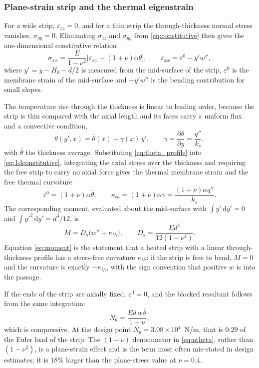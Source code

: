 \documentclass[11pt,a4paper]{article}
\newcommand{\eps}{\varepsilon}
\newcommand{\dd}{\mathrm{d}}
\begin{document}
\subsubsection{Plane-strain strip and the thermal eigenstrain}
\label{sec:eigenstrain}

For a wide strip, $\eps_{zz}=0$, and for a thin strip the through-thickness
normal stress vanishes, $\sigma_{yy}=0$. Eliminating $\sigma_{zz}$ and
$\sigma_{yy}$ from \eqref{eq:constitutive} then gives the one-dimensional
constitutive relation
\begin{equation}
\sigma_{xx}=\frac{E}{1-\nu^2}\bigl[\eps_{xx}-(1+\nu)\alpha\theta\bigr],
\qquad
\eps_{xx}=\eps^{0}-y'w'',
\label{eq:1dconstitutive}
\end{equation}
where $y'=y-H_0-d/2$ is measured from the mid-surface of the strip,
$\eps^{0}$ is the membrane strain of the mid-surface and $-y'w''$ is the
bending contribution for small slopes.

The temperature rise through the thickness is linear to leading order,
because the strip is thin compared with the axial length and its faces carry a
uniform flux and a convective condition,
\begin{equation}
\theta(y',x)=\bar\theta(x)+\gamma(x)\,y',
\qquad \gamma=\frac{\partial\theta}{\partial y}=\frac{q''}{k_s},
\label{eq:theta_profile}
\end{equation}
with $\bar\theta$ the thickness average. Substituting
\eqref{eq:theta_profile} into \eqref{eq:1dconstitutive}, integrating the axial
stress over the thickness and requiring the free strip to carry no axial force
gives the thermal membrane strain and the free thermal curvature
\begin{equation}
\eps^{0}=(1+\nu)\alpha\bar\theta,
\qquad
\kappa_{th}=(1+\nu)\alpha\gamma=\frac{(1+\nu)\alpha q''}{k_s}.
\label{eq:kappa}
\end{equation}
The corresponding moment, evaluated about the mid-surface with
$\int y'\,\dd y'=0$ and $\int y'^2\,\dd y'=d^3/12$, is
\begin{equation}
M=D_s\bigl(w''+\kappa_{th}\bigr),
\qquad
D_s=\frac{E d^3}{12(1-\nu^2)}.
\label{eq:moment}
\end{equation}
Equation \eqref{eq:moment} is the statement that a heated strip with a linear
through-thickness profile has a stress-free curvature $\kappa_{th}$: if the
strip is free to bend, $M=0$ and the curvature is exactly $-\kappa_{th}$, with
the sign convention that positive $w$ is into the passage.

If the ends of the strip are axially fixed, $\eps^{0}=0$, and the blocked
resultant follows from the same integration:
\begin{equation}
N_\theta=\frac{E d\,\alpha\,\bar\theta}{1-\nu},
\label{eq:ntheta}
\end{equation}
which is compressive. At the design point
$N_\theta=3.08\times10^{4}$~N/m, that is $0.29$ of the Euler load of the
strip. The $(1-\nu)$ denominator in \eqref{eq:ntheta}, rather than
$(1-\nu^2)$, is a plane-strain effect and is the term most often mis-stated
in design estimates; it is $18\%$ larger than the plane-stress value at
$\nu=0.4$.
\end{document}
